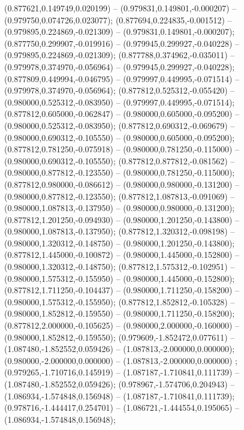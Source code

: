  (0.877621,0.149749,0.020199) -- (0.979831,0.149801,-0.000207) -- (0.979750,0.074726,0.023077);
 (0.877694,0.224835,-0.001512) -- (0.979895,0.224869,-0.021309) -- (0.979831,0.149801,-0.000207);
 (0.877750,0.299907,-0.019916) -- (0.979945,0.299927,-0.040228) -- (0.979895,0.224869,-0.021309);
 (0.877788,0.374962,-0.035011) -- (0.979978,0.374970,-0.056964) -- (0.979945,0.299927,-0.040228);
 (0.877809,0.449994,-0.046795) -- (0.979997,0.449995,-0.071514) -- (0.979978,0.374970,-0.056964);
 (0.877812,0.525312,-0.055420) -- (0.980000,0.525312,-0.083950) -- (0.979997,0.449995,-0.071514);
 (0.877812,0.605000,-0.062847) -- (0.980000,0.605000,-0.095200) -- (0.980000,0.525312,-0.083950);
 (0.877812,0.690312,-0.069679) -- (0.980000,0.690312,-0.105550) -- (0.980000,0.605000,-0.095200);
 (0.877812,0.781250,-0.075918) -- (0.980000,0.781250,-0.115000) -- (0.980000,0.690312,-0.105550);
 (0.877812,0.877812,-0.081562) -- (0.980000,0.877812,-0.123550) -- (0.980000,0.781250,-0.115000);
 (0.877812,0.980000,-0.086612) -- (0.980000,0.980000,-0.131200) -- (0.980000,0.877812,-0.123550);
 (0.877812,1.087813,-0.091069) -- (0.980000,1.087813,-0.137950) -- (0.980000,0.980000,-0.131200);
 (0.877812,1.201250,-0.094930) -- (0.980000,1.201250,-0.143800) -- (0.980000,1.087813,-0.137950);
 (0.877812,1.320312,-0.098198) -- (0.980000,1.320312,-0.148750) -- (0.980000,1.201250,-0.143800);
 (0.877812,1.445000,-0.100872) -- (0.980000,1.445000,-0.152800) -- (0.980000,1.320312,-0.148750);
 (0.877812,1.575312,-0.102951) -- (0.980000,1.575312,-0.155950) -- (0.980000,1.445000,-0.152800);
 (0.877812,1.711250,-0.104437) -- (0.980000,1.711250,-0.158200) -- (0.980000,1.575312,-0.155950);
 (0.877812,1.852812,-0.105328) -- (0.980000,1.852812,-0.159550) -- (0.980000,1.711250,-0.158200);
 (0.877812,2.000000,-0.105625) -- (0.980000,2.000000,-0.160000) -- (0.980000,1.852812,-0.159550);
 (0.979609,-1.852472,0.077611) -- (1.087480,-1.852552,0.059426) -- (1.087813,-2.000000,0.000000);
 (0.980000,-2.000000,0.000000) -- (1.087813,-2.000000,0.000000) ;
 (0.979265,-1.710716,0.145919) -- (1.087187,-1.710841,0.111739) -- (1.087480,-1.852552,0.059426);
 (0.978967,-1.574706,0.204943) -- (1.086934,-1.574848,0.156948) -- (1.087187,-1.710841,0.111739);
 (0.978716,-1.444417,0.254701) -- (1.086721,-1.444554,0.195065) -- (1.086934,-1.574848,0.156948);
